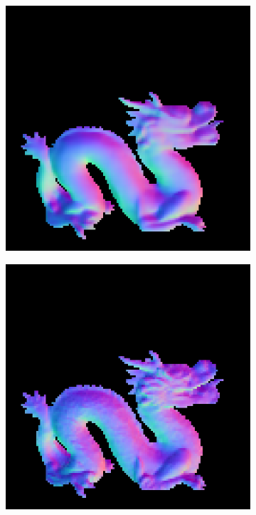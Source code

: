 \begin{figure}[H]
\begin{subfigure}[b]{0.24\linewidth}
	\end{subfigure}
	\begin{subfigure}[b]{0.24\linewidth}
		\includegraphics[width=\linewidth]{./Figures/gcnn_synthetic/fancy_eval_7_normal_GCNN-NOC.png}
	\end{subfigure}
	\begin{subfigure}[b]{0.24\linewidth}
		\includegraphics[width=\linewidth]{./Figures/gcnn_synthetic/fancy_eval_7_normal_GCNN-CNN.png}
	\end{subfigure}
	

\end{figure}
